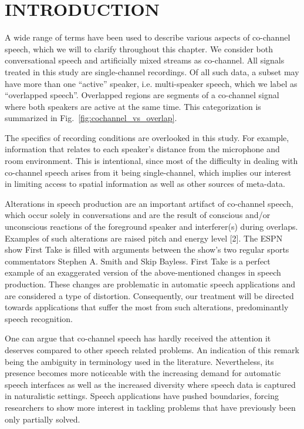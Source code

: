 
\chapter{INTRODUCTION}

A wide range of terms have been used to describe various aspects of co-channel speech, 
which we will to clarify throughout this chapter. 
We consider both conversational speech and artificially mixed streams as co-channel. 
All signals treated in this study are single-channel recordings. 
Of all such data, a subset may have more than one ``active'' speaker, i.e. multi-speaker speech, 
which we label as ``overlapped speech''. 
Overlapped regions are segments of a co-channel signal where both speakers are active at the same time. This categorization is summarized in Fig.~\ref{fig:cochannel_vs_overlap}.

The specifics of recording conditions are overlooked in this study. 
For example, information that relates to each speaker’s distance from the microphone and room environment. 
This is intentional, since most of the difficulty in dealing with co-channel speech arises 
from it being single-channel, which implies our interest in limiting access to spatial 
information as well as other sources of meta-data.

Alterations in speech production are an important artifact of co-channel speech, which occur solely in conversations and are the result of conscious and/or unconscious reactions of the foreground speaker and interferer(s) during overlaps. Examples of such alterations are raised pitch and energy level [2]. The ESPN show First Take is filled with arguments between the show’s two regular sports commentators Stephen A. Smith and Skip Bayless. First Take is a perfect example of an exaggerated version of the above-mentioned changes in speech production. These changes are problematic in automatic speech applications and are considered a type of distortion. Consequently, our treatment will be directed towards applications that suffer the most from such alterations, predominantly speech recognition.

One can argue that co-channel speech has hardly received the attention it deserves compared to other speech related problems. An indication of this remark being the ambiguity in terminology used in the literature. Nevertheless, its presence becomes more noticeable with the increasing demand for automatic speech interfaces as well as the increased diversity where speech data is captured in naturalistic settings. Speech applications have pushed boundaries, forcing researchers to show more interest in tackling problems that have previously been only partially solved.


